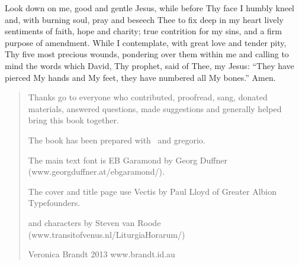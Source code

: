 \begin{center}
\begin{minipage}{5.8cm}

Look down on me, good and gentle Jesus,
while before Thy face I humbly kneel and,
with burning soul,
pray and beseech Thee
to fix deep in my heart lively sentiments
of faith, hope and charity;
true contrition for my sins,
and a firm purpose of amendment.
While I contemplate,
with great love and tender pity,
Thy five most precious wounds,
pondering over them within me
and calling to mind the words which David,
Thy prophet, said of Thee, my Jesus:
``They have pierced My hands and My feet,
they have numbered all My bones.''
Amen.
\end{minipage}
\end{center}

\vfill

\begin{quote}


Thanks go to everyone who contributed, proofread, sang, donated materials, answered questions, made suggestions and generally helped bring this book together.

The book has been prepared with \LuaLaTeX\ and gregorio. 


The main text font is EB Garamond by Georg Duffner\\
(www.georgduffner.at/ebgaramond/).

The cover and title page use Vectis by Paul Lloyd of Greater Albion Typefounders.

\Vbar and \Rbar characters by Steven van Roode\\
(www.transitofvenus.nl/LiturgiaHorarum/)

Veronica Brandt 2013 www.brandt.id.au

\end{quote}

